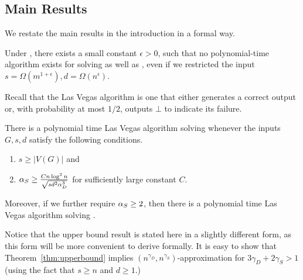 \subsection{Main Results}\label{subsec:mainresults}

We restate the main results in the introduction in a formal way.

\begin{theorem}\label{thm:main}
		Under \conj{}, there exists a small constant $\epsilon>0$, such that no polynomial-time algorithm exists for solving  as well as , even if we restricted the input $s=\Omega(m^{1+\epsilon}),d=\Omega(n^{\epsilon})$.
\end{theorem}

Recall that the Las Vegas algorithm is one that either generates a correct output or, with probability at most $1/2$, outputs $\bot$ to indicate its failure. 

\begin{theorem}\label{thm:upperbound}

  There is a polynomial time Las Vegas algorithm solving \oss{\apxS}{\apxD} whenever the inputs $G,s,d$ satisfy the following conditions.
  \begin{enumerate}
      \item $s\ge |V(G)|$  and %
      \item $\alpha_S\ge\frac{Cn\log^2 n}{\sqrt{sd^2\alpha_D^3}}$ for sufficiently large constant $C$.
  \end{enumerate}

Moreover, if we further require $\alpha_S\ge 2$, then there is a polynomial time  Las Vegas algorithm solving \TC{\apxS}{\apxD}.  
\end{theorem}

Notice that the upper bound result is stated here in a slightly different form, as this form will be more convenient to derive formally. It is easy to show that Theorem~\ref{thm:upperbound} implies $(n^{\gamma_D}, n^{\gamma_S})$-approximation for $3\gamma_D + 2\gamma_S >1$ (using the fact that $s \geq n$ and $d \geq 1$.)   
